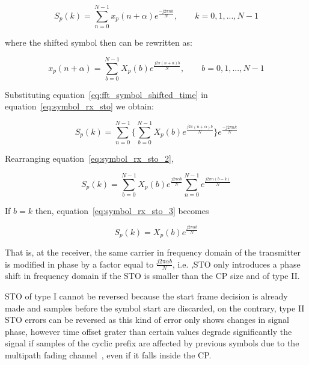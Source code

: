 \begin{equation} 
     S_{p}(k) = \sum\limits_{n=0}^{N-1} x_{p}(n+\alpha)e^{\frac{-j2{\pi}nk}{N}}, \qquad k = 0,1,...,N-1
    \label{eq:symbol_rx_sto}
\end{equation}

\noindent where the shifted symbol then can be rewritten  as:

\begin{equation} 
x_{p}(n+\alpha) = \sum\limits_{b=0}^{N-1} X_{p}(b)e^{\frac{j2{\pi}(n+\alpha)b}{N}}, \qquad b = 0,1,...,N-1
    \label{eq:fft_symbol_shifted_time}
\end{equation}

Substituting equation~\ref{eq:fft_symbol_shifted_time} in equation~\ref{eq:symbol_rx_sto} we obtain:


\begin{equation}
     S_{p}(k) = \sum\limits_{n=0}^{N-1} \Big\{ \sum\limits_{b=0}^{N-1} X_{p}(b)e^{\frac{j2{\pi}(n+\alpha)b}{N}}  \Big\} e^{\frac{-j2{\pi}nk}{N}}
    \label{eq:symbol_rx_sto_2}
\end{equation}

Rearranging equation~\ref{eq:symbol_rx_sto_2},  

\begin{equation}
  S_{p}(k) = \sum\limits_{b=0}^{N-1} X_{p}(b)e^{\frac{j2{\pi}\alpha b}{N}} \sum\limits_{n=0}^{N-1} e^{\frac{j2{\pi}n(b-k)}{N}}
    \label{eq:symbol_rx_sto_3}
\end{equation}

If $b = k$ then, equation~\ref{eq:symbol_rx_sto_3} becomes

\begin{equation}
  S_{p}(k) = X_{p}(b)e^{\frac{j2{\pi}\alpha b}{N}}
    \label{eq:symbol_rx_sto_4}
\end{equation}


That is, at the receiver, the same carrier in frequency domain of the transmitter is modified in phase by a factor equal to $\frac{j2{\pi}\alpha b}{N}$, i.e. ,STO only introduces a phase shift in frequency domain if the STO is smaller than the CP size and of type II. 


 STO of type I cannot be reversed because the start frame decision is already made and samples before the symbol start are discarded, on the contrary, type II STO errors can be reversed as this kind of error only shows changes in signal phase, however time offset grater than certain values degrade significantly the signal if samples of the cyclic prefix are affected by previous symbols due to the multipath fading channel~\cite{canet2007time}, even if it falls inside the CP.

